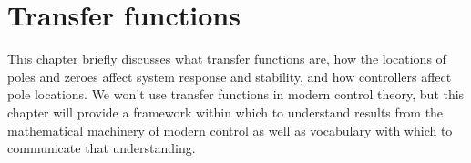 
\chapter{Transfer functions}

This chapter briefly discusses what transfer functions are, how the locations of
poles and zeroes affect \gls{system response} and stability, and how controllers
affect pole locations. We won't use transfer functions in modern control theory,
but this chapter will provide a framework within which to understand results
from the mathematical machinery of modern control as well as vocabulary with
which to communicate that understanding.

\renewcommand*{\chapterpath}{\partpath/transfer-functions}









